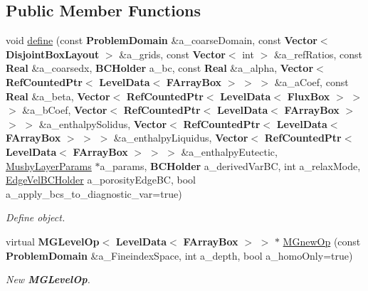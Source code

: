 \subsection*{Public Member Functions}
\begin{DoxyCompactItemize}
\item 
void \hyperlink{class_a_m_r_non_linear_multi_comp_op_factory_a6a110ce702bf42fe873594f1e2a812a4}{define} (const \textbf{ Problem\+Domain} \&a\+\_\+coarse\+Domain, const \textbf{ Vector}$<$ \textbf{ Disjoint\+Box\+Layout} $>$ \&a\+\_\+grids, const \textbf{ Vector}$<$ int $>$ \&a\+\_\+ref\+Ratios, const \textbf{ Real} \&a\+\_\+coarsedx, \textbf{ B\+C\+Holder} a\+\_\+bc, const \textbf{ Real} \&a\+\_\+alpha, \textbf{ Vector}$<$ \textbf{ Ref\+Counted\+Ptr}$<$ \textbf{ Level\+Data}$<$ \textbf{ F\+Array\+Box} $>$ $>$ $>$ \&a\+\_\+a\+Coef, const \textbf{ Real} \&a\+\_\+beta, \textbf{ Vector}$<$ \textbf{ Ref\+Counted\+Ptr}$<$ \textbf{ Level\+Data}$<$ \textbf{ Flux\+Box} $>$ $>$ $>$ \&a\+\_\+b\+Coef, \textbf{ Vector}$<$ \textbf{ Ref\+Counted\+Ptr}$<$ \textbf{ Level\+Data}$<$ \textbf{ F\+Array\+Box} $>$ $>$ $>$ \&a\+\_\+enthalpy\+Solidus, \textbf{ Vector}$<$ \textbf{ Ref\+Counted\+Ptr}$<$ \textbf{ Level\+Data}$<$ \textbf{ F\+Array\+Box} $>$ $>$ $>$ \&a\+\_\+enthalpy\+Liquidus, \textbf{ Vector}$<$ \textbf{ Ref\+Counted\+Ptr}$<$ \textbf{ Level\+Data}$<$ \textbf{ F\+Array\+Box} $>$ $>$ $>$ \&a\+\_\+enthalpy\+Eutectic, \hyperlink{class_mushy_layer_params}{Mushy\+Layer\+Params} $\ast$a\+\_\+params, \textbf{ B\+C\+Holder} a\+\_\+derived\+Var\+BC, int a\+\_\+relax\+Mode, \hyperlink{class_edge_vel_b_c_holder}{Edge\+Vel\+B\+C\+Holder} a\+\_\+porosity\+Edge\+BC, bool a\+\_\+apply\+\_\+bcs\+\_\+to\+\_\+diagnostic\+\_\+var=true)
\begin{DoxyCompactList}\small\item\em Define object. \end{DoxyCompactList}\item 
virtual \textbf{ M\+G\+Level\+Op}$<$ \textbf{ Level\+Data}$<$ \textbf{ F\+Array\+Box} $>$ $>$ $\ast$ \hyperlink{class_a_m_r_non_linear_multi_comp_op_factory_a4a0bf3a8d0337e5a42ce03648779bc73}{M\+Gnew\+Op} (const \textbf{ Problem\+Domain} \&a\+\_\+\+Fineindex\+Space, int a\+\_\+depth, bool a\+\_\+homo\+Only=true)
\begin{DoxyCompactList}\small\item\em New \textbf{ M\+G\+Level\+Op}. \end{DoxyCompactList}\item 
\mbox{\label{class_a_m_r_non_linear_multi_comp_op_factory_aa9a0f8df336179fba6a0ccb390914c55}} 

\end{DoxyCompactItemize}
